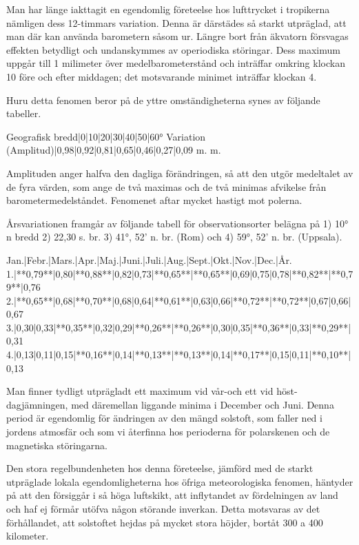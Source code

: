 \documentclass[a4paper, 12pt, oneside, swedish]{article}
\begin{document}
Man har länge iakttagit en egendomlig företeelse hos lufttrycket i tropikerna nämligen dess 12-timmars variation. Denna är därstädes så starkt utpräglad, att man där kan använda barometern såsom ur. Längre bort från äkvatorn försvagas effekten betydligt och undanskymmes av operiodiska störingar. Dess maximum uppgår till 1 milimeter över medelbarometerstånd och inträffar omkring klockan 10 före och efter middagen; det motsvarande minimet inträffar klockan 4.

Huru detta fenomen beror på de yttre omständigheterna synes av följande tabeller.

Geografisk bredd|0|10|20|30|40|50|60°  
Variation (Amplitud)|0,98|0,92|0,81|0,65|0,46|0,27|0,09 m. m.

Amplituden anger halfva den dagliga förändringen, så att den utgör medeltalet av de fyra värden, som ange de två maximas och de två minimas afvikelse från barometermedelståndet. Fenomenet aftar mycket hastigt mot polerna.

Årsvariationen framgår av följande tabell för observationsorter belägna på 1) 10° n bredd 2) 22,30 s. br. 3) 41°, 52' n. br. (Rom) och 4) 59°, 52' n. br. (Uppsala).

Jan.|Febr.|Mars.|Apr.|Maj.|Juni.|Juli.|Aug.|Sept.|Okt.|Nov.|Dec.|År.  
1.|**0,79**|0,80|**0,88**|0,82|0,73|**0,65**|**0,65**|0,69|0,75|0,78|**0,82**|**0,79**|0,76  
2.|**0,65**|0,68|**0,70**|0,68|0,64|**0,61**|0,63|0,66|**0,72**|**0,72**|0,67|0,66|0,67  
3.|0,30|0,33|**0,35**|0,32|0,29|**0,26**|**0,26**|0,30|0,35|**0,36**|0,33|**0,29**|0,31  
4.|0,13|0,11|0,15|**0,16**|0,14|**0,13**|**0,13**|0,14|**0,17**|0,15|0,11|**0,10**|0,13  

Man finner tydligt utprägladt ett maximum vid vår-och ett vid höst-dagjämningen, med däremellan liggande minima i December och Juni. Denna period är egendomlig för ändringen av den mängd solstoft, som faller ned i jordens atmosfär och som vi återfinna hos perioderna för polarskenen och de magnetiska störingarna.

Den stora regelbundenheten hos denna företeelse, jämförd med de starkt utpräglade lokala egendomligheterna hos öfriga meteorologiska fenomen, häntyder på att den försiggår i så höga luftskikt, att inflytandet av fördelningen av land och haf ej förmår utöfva någon störande inverkan. Detta motsvaras av det förhållandet, att solstoftet hejdas på mycket stora höjder, bortåt 300 a 400 kilometer.
\end{document}
